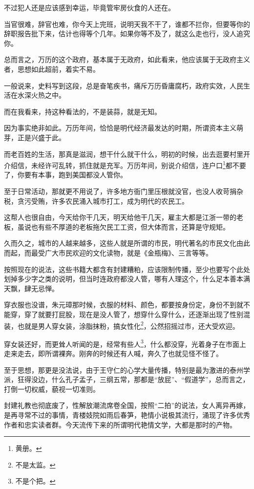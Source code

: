 \begin{multicols}{\theparacolNo}
		不过犯人还是应该感到幸运，毕竟管牢房伙食的人还在。

		当官很难，辞官也难，你今天上完班，说明天我不干了，谁都不拦你，但要等你的辞职报告批下来，估计也得等个几年。如果你等不及了，就这么走也行，没人追究你。

		总而言之，万历的这个政府，基本属于无政府，如此看来，他应该属于无政府主义者，思想如此超前，着实不易。

		一般说来，史料写到这段，总是奋笔疾书，痛斥万历昏庸腐朽，政府实效，人民生活在水深火热之中。

		而在我看来，持这种看法的，不是装蒜，就是无知。

		因为事实绝非如此。万历年间，恰恰是明代经济最发达的时期，所谓资本主义萌芽，正是兴盛于此。

		而老百姓的生活，那真是滋润，想干什么就干什么，明初的时候，出去逛要村里开介绍信，未经许可乱转，抓住就是充军。万历年间，别说介绍信，连户口\footnote{黄册。}都不要了，你要有本事，跑到美国都没人管你。

		至于日常活动，那就更不用说了，许多地方衙门里压根就没官，也没人收苛捐杂税，贪污受贿，许多农民涌入城市打工，成为明代的农民工。

		这帮人也很自由，今天给你干几天，明天给他干几天，雇主大都是江浙一带的老板，虽说也有些不厚道的老板拖欠民工工资，但大体而言，还算是守规矩。

		久而久之，城市的人越来越多，这些人就是所谓的市民，明代著名的市民文化由此而起，而最受广大市民欢迎的文化读物，就是《金瓶梅》、三言等等。

		按照现在的说法，这些书籍大都含有封建糟粕，应该限制传播，至少也要写个此处划掉多少字之类的说明，但当时连政府都没人管，哪有人理这个，什么足本善本满天飘，肆无忌惮。

		穿衣服也没谱，朱元璋那时候，衣服的材料、颜色，都要按身份定，身份不到就不能穿，穿了就要打屁股，现在是没人管了，想穿什么穿什么，还逐渐出现了性别混装，也就是男人穿女装，涂脂抹粉，搞女性化\footnote{不是太监。}，公然招摇过市，还大受欢迎。

		穿女装还好，而更耸人听闻的是，经常有些人\footnote{不是个把。}，什么都没穿，光着身子在市面上走来走去，即所谓裸奔。刚奔的时候还有人喊，奔久了也就见怪不怪了。

		至于思想，那更是没法说，由于王守仁的心学大量传播，特别是最为激进的泰州学派，狂得没边，什么孔子孟子，三纲五常，那都是“放屁”、“假道学”，总而言之，打倒一切权威，藐视一切准则。

		封建礼教也彻底废了，性解放潮流席卷全国，按照“二拍”的说法，女人离异再嫁，是再寻常不过的事情，青楼妓院如雨后春笋，艳情小说极其流行，涌现了许多优秀作者和忠实读者群。今天流传下来的所谓明代艳情文学，大都是那时的产物。


\end{multicols}
